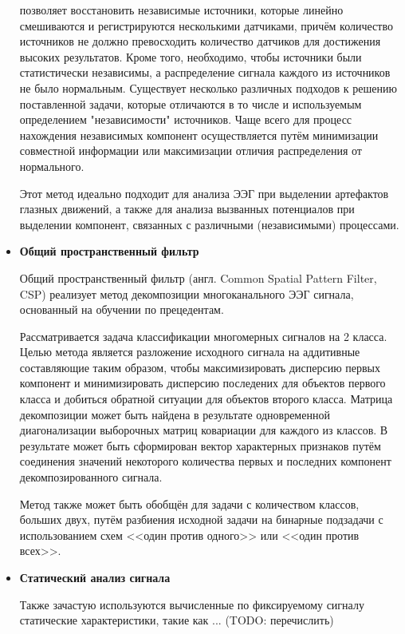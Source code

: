 \documentclass[12pt,fleqn]{article}
\begin{document}
\begin{itemize}
позволяет восстановить независимые источники, которые линейно смешиваются и регистрируются несколькими датчиками, причём количество источников не должно превосходить количество датчиков для достижения высоких результатов. Кроме того, необходимо, чтобы источники были статистически независимы, а распределение сигнала каждого из источников не было нормальным. Существует несколько различных подходов к решению поставленной задачи, которые отличаются в то числе и используемым определением "независимости" источников. Чаще всего для процесс нахождения независимых компонент осуществляется путём минимизации совместной информации или максимизации отличия распределения от нормального.
	\par Этот метод идеально подходит для анализа ЭЭГ при выделении артефактов глазных движений, а также для анализа вызванных потенциалов при выделении компонент, связанных с различными (независимыми) процессами.
	\item
	{\bf Общий пространственный фильтр}
	\par Общий пространственный фильтр (англ. Common Spatial Pattern Filter, CSP) реализует метод декомпозиции многоканального ЭЭГ сигнала, основанный на обучении по прецедентам.
	\par Рассматривается задача классификации многомерных сигналов на 2 класса. Целью метода является разложение исходного сигнала на аддитивные составляющие таким образом, чтобы максимизировать дисперсию первых компонент и минимизировать дисперсию последених для объектов первого класса и добиться обратной ситуации для объектов второго класса. Матрица декомпозиции может быть найдена в результате одновременной диагонализации выборочных матриц ковариации для каждого из классов. В результате может быть сформирован вектор характерных признаков путём соединения значений некоторого количества первых и последних компонент декомпозированного сигнала.
	\par Метод также может быть обобщён для задачи с количеством классов, больших двух, путём разбиения исходной задачи на бинарные подзадачи с использованием схем <<один против одного>> или <<один против всех>>.
	\item
	{\bf Статический анализ сигнала}
	\par Также зачастую используются вычисленные по фиксируемому сигналу статические характеристики, такие как ... (TODO: перечислить)
	
	\end{itemize}
\end{document}
